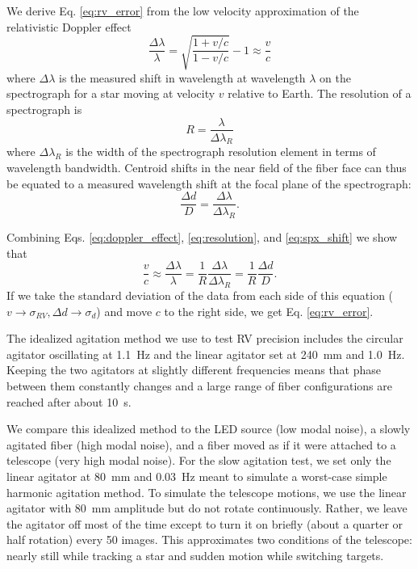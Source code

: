 \documentclass[twocolumn]{emulateapj}
\begin{document}
We derive Eq. \ref{eq:rv_error} from the low velocity approximation of the relativistic Doppler effect
\begin{equation}
\frac{\Delta \lambda}{\lambda} = \sqrt{\frac{1 + v/c}{1-v/c}} - 1 \approx \frac{v}{c}
\label{eq:doppler_effect}
\end{equation}
where $\Delta \lambda$ is the measured shift in wavelength at wavelength $\lambda$ on the spectrograph for a star moving at velocity $v$ relative to Earth. The resolution of a spectrograph is
\begin{equation}
R = \frac{\lambda}{\Delta \lambda_R}
\label{eq:resolution}
\end{equation}
where $\Delta \lambda_R$ is the width of the spectrograph resolution element in terms of wavelength bandwidth. Centroid shifts in the near field of the fiber face can thus be equated to a measured wavelength shift at the focal plane of the spectrograph:
\begin{equation}
\frac{\Delta d}{D} = \frac{\Delta \lambda}{\Delta \lambda_R}.
\label{eq:spx_shift}
\end{equation}

Combining Eqs. \ref{eq:doppler_effect}, \ref{eq:resolution}, and \ref{eq:spx_shift} we show that
\begin{equation}
\frac{v}{c} \approx \frac{\Delta \lambda}{\lambda} = \frac{1}{R} \frac{\Delta \lambda}{\Delta \lambda_R} = \frac{1}{R} \frac{\Delta d}{D}.
\end{equation}
If we take the standard deviation of the data from each side of this equation ($v \rightarrow \sigma_{RV}, \Delta d \rightarrow \sigma_d$) and move $c$ to the right side, we get Eq. \ref{eq:rv_error}.

The idealized agitation method we use to test RV precision includes the circular agitator oscillating at \SI{1.1}{\hertz} and the linear agitator set at \SI{240}{\milli\meter} and \SI{1.0}{\hertz}. Keeping the two agitators at slightly different frequencies means that phase between them constantly changes and a large range of fiber configurations are reached after about \SI{10}{\second}.

We compare this idealized method to the LED source (low modal noise), a slowly agitated fiber (high modal noise), and a fiber moved as if it were attached to a telescope (very high modal noise). For the slow agitation test, we set only the linear agitator at \SI{80}{\milli\meter} and \SI{0.03}{\hertz} meant to simulate a worst-case simple harmonic agitation method. To simulate the telescope motions, we use the linear agitator with \SI{80}{\milli\meter} amplitude but do not rotate continuously. Rather, we leave the agitator off most of the time except to turn it on briefly (about a quarter or half rotation) every 50 images. This approximates two conditions of the telescope: nearly still while tracking a star and sudden motion while switching targets.
\end{document}
